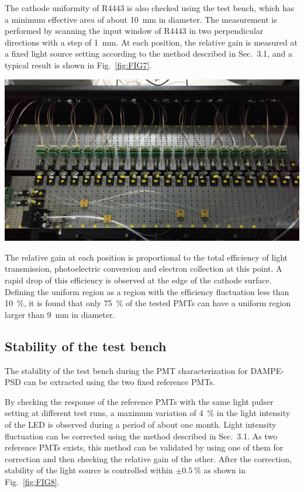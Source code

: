 \documentclass[a4paper,10pt,twoside]{cpc-hepnp}
\begin{document}
\begin{multicols}{2}
The cathode uniformity of R4443 is also checked using the test bench, which has a minimum effective area of about \SI{10}{\milli\meter} in diameter.
The measurement is performed by scanning the input window of R4443 in two perpendicular directions with a step of \SI{1}{\milli\meter}.
At each position, the relative gain is measured at a fixed light source setting according to the method described in Sec.~3.1, and a typical result is shown in Fig.~\ref{fig:FIG7}.

\begin{center}
	\includegraphics[width=\linewidth]{FIG7}
\end{center} 

The relative gain at each position is proportional to the total efficiency of light transmission, photoelectric conversion and electron collection at this point.
A rapid drop of this efficiency is observed at the edge of the cathode surface. 
Defining the uniform region as a region with the efficiency fluctuation less than \SI{10}{\percent}, it is found that only \SI{75}{\percent} of the tested PMTs can have a uniform region larger than \SI{9}{\milli\meter} in diameter. 


\subsection{Stability of the test bench}
\label{sec:stability}

The stability of the test bench during the PMT characterization for DAMPE-PSD can be extracted using the two fixed reference PMTs.

By checking the response of the reference PMTs with the same light pulser setting at different test runs, a maximum variation of \SI{4}{\percent} in the light intensity of the LED is observed during a period of about one month.
Light intensity fluctuation can be corrected using the method described in Sec.~3.1.
As two reference PMTs exists, this method can be validated by using one of them for correction and then checking the relative gain of the other. 
After the correction, stability of the light source is controlled within $\pm\SI{0.5}{\percent}$ as shown in Fig.~\ref{fig:FIG8}.


\end{multicols}
\end{document}
